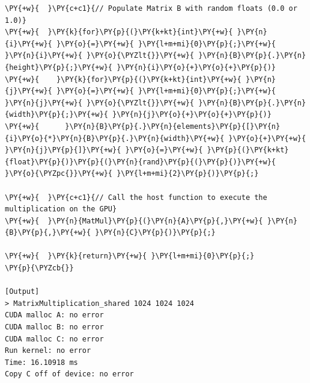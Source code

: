 \begin{Verbatim}[label=\makebox{\url{https://github.com/lucabaldini/cmepda/tree/master/slides/latex/snippets/MatrixMultiplication_shared.cu}},commandchars=\\\{\}]
\PY{+w}{  }\PY{c+c1}{// Populate Matrix B with random floats (0.0 or 1.0)}
\PY{+w}{  }\PY{k}{for}\PY{p}{(}\PY{k+kt}{int}\PY{+w}{ }\PY{n}{i}\PY{+w}{ }\PY{o}{=}\PY{+w}{ }\PY{l+m+mi}{0}\PY{p}{;}\PY{+w}{ }\PY{n}{i}\PY{+w}{ }\PY{o}{\PYZlt{}}\PY{+w}{ }\PY{n}{B}\PY{p}{.}\PY{n}{height}\PY{p}{;}\PY{+w}{ }\PY{n}{i}\PY{o}{+}\PY{o}{+}\PY{p}{)}
\PY{+w}{    }\PY{k}{for}\PY{p}{(}\PY{k+kt}{int}\PY{+w}{ }\PY{n}{j}\PY{+w}{ }\PY{o}{=}\PY{+w}{ }\PY{l+m+mi}{0}\PY{p}{;}\PY{+w}{ }\PY{n}{j}\PY{+w}{ }\PY{o}{\PYZlt{}}\PY{+w}{ }\PY{n}{B}\PY{p}{.}\PY{n}{width}\PY{p}{;}\PY{+w}{ }\PY{n}{j}\PY{o}{+}\PY{o}{+}\PY{p}{)}
\PY{+w}{      }\PY{n}{B}\PY{p}{.}\PY{n}{elements}\PY{p}{[}\PY{n}{i}\PY{o}{*}\PY{n}{B}\PY{p}{.}\PY{n}{width}\PY{+w}{ }\PY{o}{+}\PY{+w}{ }\PY{n}{j}\PY{p}{]}\PY{+w}{ }\PY{o}{=}\PY{+w}{ }\PY{p}{(}\PY{k+kt}{float}\PY{p}{)}\PY{p}{(}\PY{n}{rand}\PY{p}{(}\PY{p}{)}\PY{+w}{ }\PY{o}{\PYZpc{}}\PY{+w}{ }\PY{l+m+mi}{2}\PY{p}{)}\PY{p}{;}

\PY{+w}{  }\PY{c+c1}{// Call the host function to execute the multiplication on the GPU}
\PY{+w}{  }\PY{n}{MatMul}\PY{p}{(}\PY{n}{A}\PY{p}{,}\PY{+w}{ }\PY{n}{B}\PY{p}{,}\PY{+w}{ }\PY{n}{C}\PY{p}{)}\PY{p}{;}

\PY{+w}{  }\PY{k}{return}\PY{+w}{ }\PY{l+m+mi}{0}\PY{p}{;}
\PY{p}{\PYZcb{}}

[Output]
> MatrixMultiplication_shared 1024 1024 1024
CUDA malloc A: no error
CUDA malloc B: no error
CUDA malloc C: no error
Run kernel: no error
Time: 16.10918 ms
Copy C off of device: no error
\end{Verbatim}